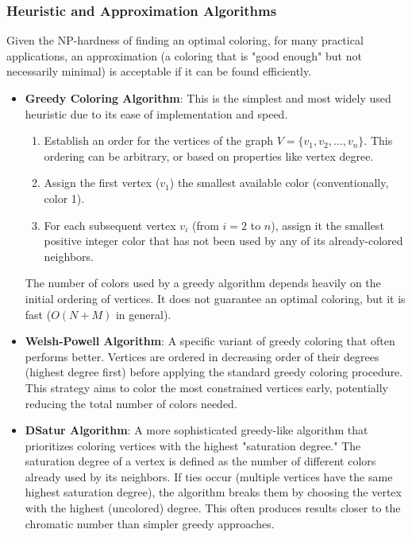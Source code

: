 \documentclass[11pt, a4paper]{article}
\begin{document}
\subsubsection{Heuristic and Approximation Algorithms}
Given the NP-hardness of finding an optimal coloring, for many practical applications, an approximation (a coloring that is "good enough" but not necessarily minimal) is acceptable if it can be found efficiently.
\begin{itemize}[noitemsep,topsep=3pt,parsep=3pt,partopsep=0pt]
    \item \textbf{Greedy Coloring Algorithm}: This is the simplest and most widely used heuristic due to its ease of implementation and speed.
    \begin{enumerate}[label=(\roman*),noitemsep,topsep=3pt,parsep=3pt,partopsep=0pt]
        \item Establish an order for the vertices of the graph $V = \{v_1, v_2, \ldots, v_n\}$. This ordering can be arbitrary, or based on properties like vertex degree.
        \item Assign the first vertex ($v_1$) the smallest available color (conventionally, color 1).
        \item For each subsequent vertex $v_i$ (from $i=2$ to $n$), assign it the smallest positive integer color that has not been used by any of its already-colored neighbors.
    \end{enumerate}
    The number of colors used by a greedy algorithm depends heavily on the initial ordering of vertices. It does not guarantee an optimal coloring, but it is fast ($O(N+M)$ in general).
    \item \textbf{Welsh-Powell Algorithm}: A specific variant of greedy coloring that often performs better. Vertices are ordered in decreasing order of their degrees (highest degree first) before applying the standard greedy coloring procedure. This strategy aims to color the most constrained vertices early, potentially reducing the total number of colors needed.
    \item \textbf{DSatur Algorithm}: A more sophisticated greedy-like algorithm that prioritizes coloring vertices with the highest "saturation degree." The saturation degree of a vertex is defined as the number of different colors already used by its neighbors. If ties occur (multiple vertices have the same highest saturation degree), the algorithm breaks them by choosing the vertex with the highest (uncolored) degree. This often produces results closer to the chromatic number than simpler greedy approaches.
\end{itemize}
\end{document}
